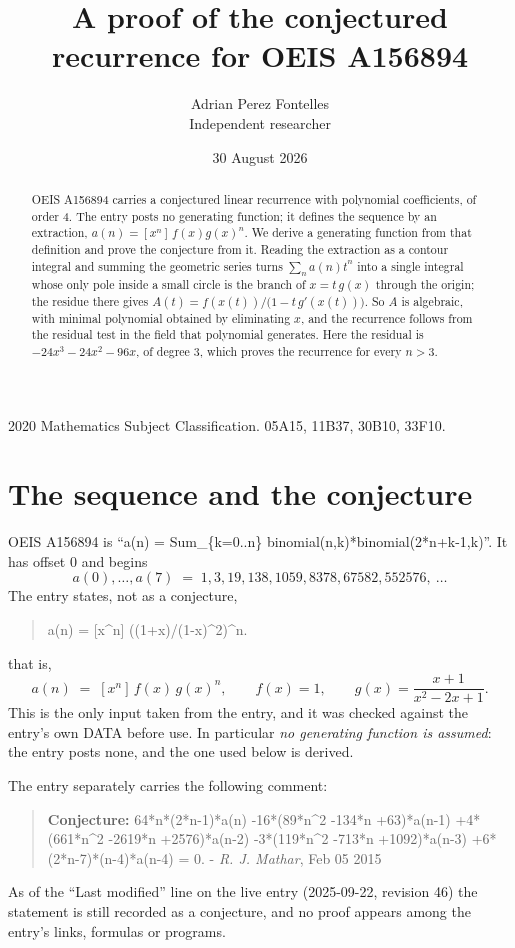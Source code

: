 \documentclass[11pt,a4paper]{article}
\title{A proof of the conjectured recurrence for OEIS A156894}
\author{Adrian Perez Fontelles\\ \small Independent researcher}
\date{30 August 2026}
\theoremstyle{plain}
\theoremstyle{definition}
\begin{document}
\maketitle

\begin{abstract}
OEIS A156894 carries a conjectured linear recurrence with polynomial coefficients, of
order 4. The entry posts no generating function; it defines the sequence by an
extraction, $a(n)=[x^{n}]\,f(x)g(x)^{n}$. We derive a generating function from that
definition and prove the conjecture from it. Reading the extraction as a contour integral
and summing the geometric series turns $\sum_{n}a(n)t^{n}$ into a single integral whose
only pole inside a small circle is the branch of $x=t\,g(x)$ through the origin; the
residue there gives $A(t)=f(x(t))/\bigl(1-t\,g'(x(t))\bigr)$. So $A$ is algebraic, with
minimal polynomial obtained by eliminating $x$, and the recurrence follows from the
residual test in the field that polynomial generates. Here the residual is
$- 24 x^{3} - 24 x^{2} - 96 x$, of degree $3$, which proves the recurrence for every $n>3$.
\end{abstract}

\noindent\small 2020 Mathematics Subject Classification. 05A15, 11B37, 30B10, 33F10.\normalsize

\section{The sequence and the conjecture}

OEIS A156894 is ``a(n) = Sum\_\{k=0..n\} binomial(n,k)*binomial(2*n+k-1,k)''. It has offset $0$ and begins
\[
a(0),\dots,a(7)\;=\;1, 3, 19, 138, 1059, 8378, 67582, 552576,\ \dots
\]
The entry states, not as a conjecture,
\begin{quote}\small
a(n) = [x\^{}n] ((1+x)/(1-x)\^{}2)\^{}n.
\end{quote}
that is,
\begin{equation}\label{eq:def}
a(n)\;=\;[x^{n}]\,f(x)\,g(x)^{n},
\qquad f(x)=1,\qquad g(x)=\frac{x + 1}{x^{2} - 2 x + 1} .
\end{equation}
This is the only input taken from the entry, and it was checked against the entry's own
DATA before use. In particular \emph{no generating function is assumed}: the entry posts
none, and the one used below is derived.

The entry separately carries the following comment:
\begin{quote}\small
\textbf{Conjecture:} 64*n*(2*n-1)*a(n) -16*(89*n\^{}2 -134*n +63)*a(n-1) +4*(661*n\^{}2 -2619*n +2576)*a(n-2) -3*(119*n\^{}2 -713*n +1092)*a(n-3) +6*(2*n-7)*(n-4)*a(n-4) = 0. - \emph{R. J. Mathar}, Feb 05 2015
\end{quote}
As of the ``Last modified'' line on the live entry (2025-09-22, revision 46) the
statement is still recorded as a conjecture, and no proof appears among the entry's links,
formulas or programs.
\end{document}

